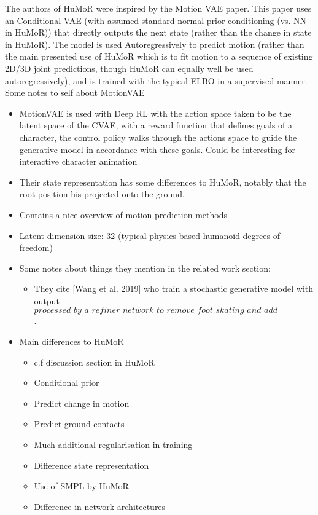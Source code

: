 The authors of HuMoR \cite{humor} were inspired by the Motion VAE \cite{TODO} paper. This paper uses an Conditional VAE (with assumed standard normal prior conditioning (vs. NN in HuMoR)) that directly outputs the next state (rather than the change in state in HuMoR). The model is used Autoregressively to predict motion (rather than the main presented use of HuMoR which is to fit motion to a sequence of existing 2D/3D joint predictions, though HuMoR can equally well be used autoregressively), and is trained with the typical ELBO in a supervised manner.
Some notes to self about MotionVAE
\begin{itemize}
    \item MotionVAE is used with Deep RL with the action space taken to be the latent space of the CVAE, with a reward function that defines goals of a character, the control policy walks through the actions space to guide the generative model in accordance with these goals. Could be interesting for interactive character animation
    \item Their state representation has some differences to HuMoR, notably that the root position his projected onto the ground.
    \item Contains a nice overview of motion prediction methods
    \item Latent dimension size: 32 (typical physics based humanoid degrees of freedom)
    \item Some notes about things they mention in the related work section:
    \begin{itemize}
        \item They cite [Wang et al. 2019] who train a stochastic generative model with output $\textit{processed by a refiner network to remove foot skating and add robustness}$.
    \end{itemize}
    \item Main differences to HuMoR
    \begin{itemize}
        \item c.f discussion section in HuMoR
        \item Conditional prior
        \item Predict change in motion
        \item Predict ground contacts
        \item Much additional regularisation in training
        \item Difference state representation
        \item Use of SMPL by HuMoR
        \item Difference in network architectures

\end{itemize}
\end{itemize}
